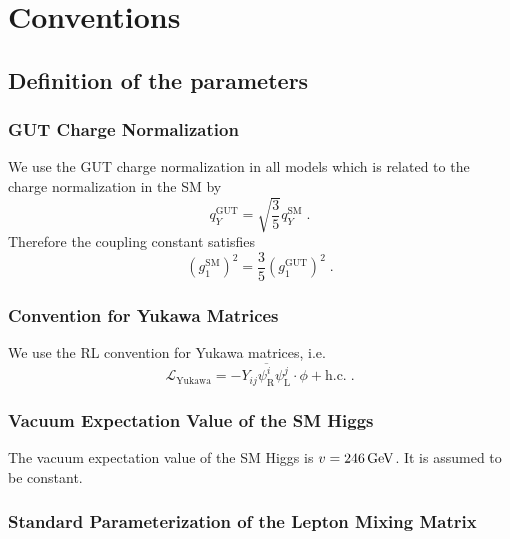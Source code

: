 \section{Conventions}

\subsection{Definition of the parameters}

\subsubsection{GUT Charge Normalization}
We use the GUT charge normalization in all models which is related to the charge normalization in the SM by
\begin{equation}
  q_Y^\text{GUT}=\sqrt{\frac{3}{5}}q^\text{SM}_Y\; .
\end{equation}
Therefore the coupling constant satisfies
\begin{equation}
  \left(g^\text{SM}_1\right)^2=\frac{3}{5}\left(g_1^\text{GUT}\right)^2\; .
\end{equation}

\subsubsection{Convention for Yukawa Matrices}
We use the RL convention for Yukawa matrices, i.e.\
\begin{equation}
  \mathscr{L}_\text{Yukawa}=-Y_{ij} \overline{\psi_\mathrm{R}^i}
  \psi_\mathrm{L}^j \cdot \phi + \text{h.c.} \;.
\end{equation}

\subsubsection{Vacuum Expectation Value of the SM Higgs}
The vacuum expectation value of the SM Higgs is $v=246\,\mathrm{GeV}$.
It is assumed to be constant.

\subsubsection{Standard Parameterization of the Lepton Mixing Matrix}

